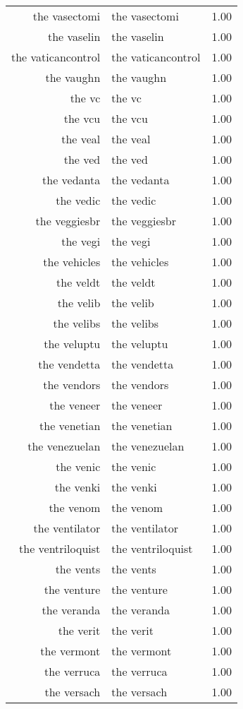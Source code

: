 \begin{table}[ht]
\begin{tabular}{rlr}
  the vasectomi & the vasectomi & 1.00 \\ 
  the vaselin & the vaselin & 1.00 \\ 
  the vaticancontrol & the vaticancontrol & 1.00 \\ 
  the vaughn & the vaughn & 1.00 \\ 
  the vc & the vc & 1.00 \\ 
  the vcu & the vcu & 1.00 \\ 
  the veal & the veal & 1.00 \\ 
  the ved & the ved & 1.00 \\ 
  the vedanta & the vedanta & 1.00 \\ 
  the vedic & the vedic & 1.00 \\ 
  the veggiesbr & the veggiesbr & 1.00 \\ 
  the vegi & the vegi & 1.00 \\ 
  the vehicles & the vehicles & 1.00 \\ 
  the veldt & the veldt & 1.00 \\ 
  the velib & the velib & 1.00 \\ 
  the velibs & the velibs & 1.00 \\ 
  the veluptu & the veluptu & 1.00 \\ 
  the vendetta & the vendetta & 1.00 \\ 
  the vendors & the vendors & 1.00 \\ 
  the veneer & the veneer & 1.00 \\ 
  the venetian & the venetian & 1.00 \\ 
  the venezuelan & the venezuelan & 1.00 \\ 
  the venic & the venic & 1.00 \\ 
  the venki & the venki & 1.00 \\ 
  the venom & the venom & 1.00 \\ 
  the ventilator & the ventilator & 1.00 \\ 
  the ventriloquist & the ventriloquist & 1.00 \\ 
  the vents & the vents & 1.00 \\ 
  the venture & the venture & 1.00 \\ 
  the veranda & the veranda & 1.00 \\ 
  the verit & the verit & 1.00 \\ 
  the vermont & the vermont & 1.00 \\ 
  the verruca & the verruca & 1.00 \\ 
  the versach & the versach & 1.00 \\ 

\end{tabular}
\end{table}
